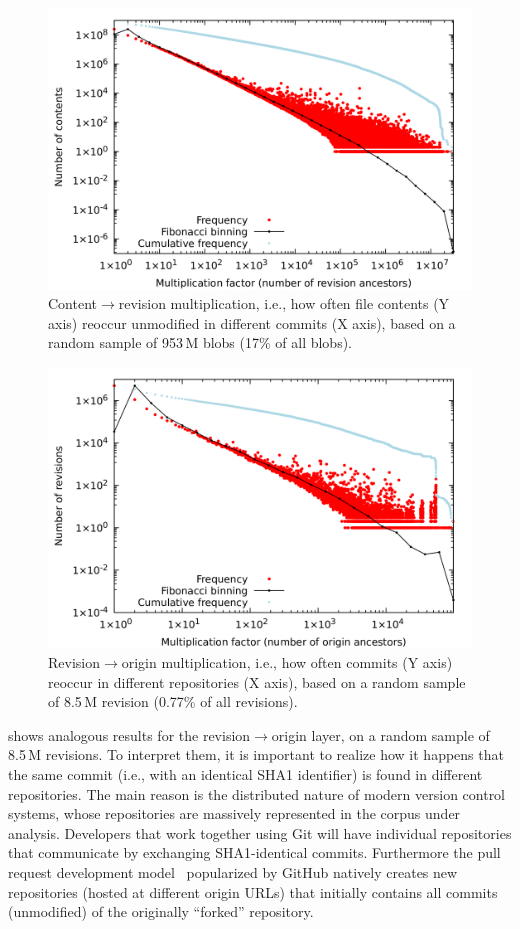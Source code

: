 \smallskip

\begin{figure}
  \centering
  \includegraphics[width=0.7\linewidth]{img/compression/distributions/contents.png}
  \caption{Content$\to$revision multiplication, i.e., how often file contents
    (Y axis) reoccur unmodified in different commits (X axis), based on a
    random sample of 953\,M blobs (17\% of all blobs).}%
  \label{fig:compression-distrib-cnt-rev}
\end{figure}

\begin{figure}
  \centering
  \includegraphics[width=0.7\linewidth]{img/compression/distributions/revisions.png}
  \caption{Revision$\to$origin multiplication, i.e., how often commits (Y axis)
    reoccur in different repositories (X axis), based on a random sample of
    8.5\,M revision (0.77\% of all revisions).}%
  \label{fig:compression-distrib-rev-ori}
\end{figure}

 shows analogous results for the
revision$\to$origin layer, on a random sample of 8.5\,M revisions. To interpret
them, it is important to realize how it happens that the same commit (i.e.,
with an identical SHA1 identifier) is found in different repositories. The main
reason is the distributed nature of modern version control systems, whose
repositories are massively represented in the corpus under analysis. Developers
that work together using Git will have individual repositories that communicate
by exchanging SHA1-identical commits. Furthermore the pull request development
model~\cite{gousios2014pullrequests} popularized by GitHub natively creates new
repositories (hosted at different origin URLs) that initially contains all
commits (unmodified) of the originally ``forked'' repository.

